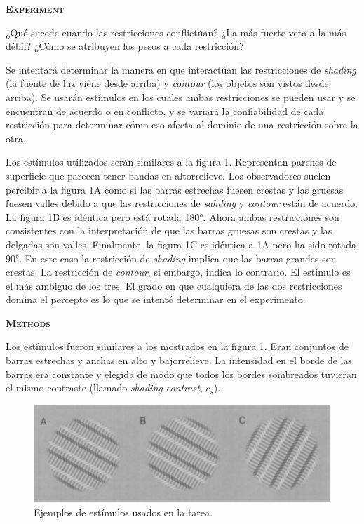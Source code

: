 \documentclass[a4paper,12pt]{article}
\begin{document}
{\scshape\bfseries Experiment}

¿Qué sucede cuando las restricciones conflictúan? ¿La más fuerte veta a la más débil? ¿Cómo se atribuyen los pesos a cada restricción?

Se intentará determinar la manera en que interactúan las restricciones de {\itshape shading} (la fuente de luz viene desde arriba) y {\itshape contour} (los objetos son vistos desde arriba). Se usarán estímulos en los cuales ambas restricciones se pueden usar y se encuentran de acuerdo o en conflicto, y se variará la confiabilidad de cada restricción para determinar cómo eso afecta al dominio de una restricción sobre la otra.

Los estímulos utilizados serán similares a la figura 1. Representan parches de superficie que parecen tener bandas en altorrelieve. Los observadores suelen percibir a la figura 1A como si las barras estrechas fuesen crestas y las gruesas fuesen valles debido a que las restricciones de {\itshape sahding} y {\itshape contour} están de acuerdo. La figura 1B es idéntica pero está rotada 180°. Ahora ambas restricciones son consistentes con la interpretación de que las barras gruesas son crestas y las delgadas son valles. Finalmente, la figura 1C es idéntica a 1A pero ha sido rotada 90°. En este caso la restricción de {\itshape shading} implica que las barras grandes son crestas. La restricción de {\itshape contour}, si embargo, indica lo contrario. El estímulo es el más ambiguo de los tres. El grado en que cualquiera de las dos restricciones domina el percepto es lo que se intentó determinar en el experimento.

{\scshape\bfseries Methods}

Los estímulos fueron similares a los mostrados en la figura 1. Eran conjuntos de barras estrechas y anchas en alto y bajorrelieve. La intensidad en el borde de las barras era constante y elegida de modo que todos los bordes sombreados tuvieran el mismo contraste (llamado {\itshape shading contrast}, $c_{s}$). 

\begin{figure}[hb]
	\begin{center}
		\includegraphics[scale=0.5]{Mamassian2001a(1).png}
		\caption{Ejemplos de estímulos usados en la tarea.}
	\end{center}
\end{figure}
\end{document}
